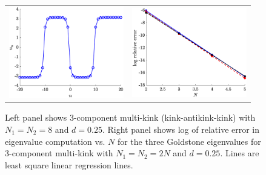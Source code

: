 \documentclass[12pt,reqno]{amsart}
\begin{document}
\begin{figure}[H]
	\begin{center}
	\begin{tabular}{cc}
	\includegraphics[width=5cm]{3kink.eps} &
	\includegraphics[width=5cm]{goldstone3prelerror.eps}
	\end{tabular}
	\end{center}
	\caption{Left panel shows 3-component multi-kink (kink-antikink-kink) with $N_1 = N_2 = 8$ and $d = 0.25$. Right panel shows log of relative error in eigenvalue computation vs. $N$ for the three Goldstone eigenvalues for 3-component multi-kink with $N_1 = N_2 = 2N$ and $d = 0.25$. Lines are least square linear regression lines.} 
	\label{fig:3p}
\end{figure}
\end{document}
